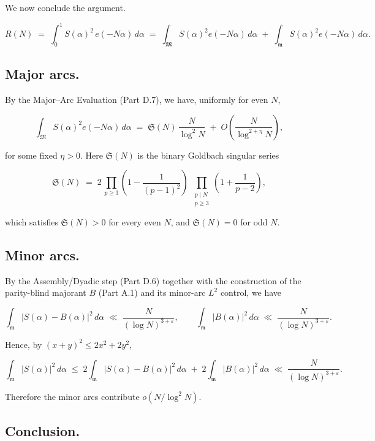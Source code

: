 \documentclass[11pt]{article}
\theoremstyle{definition}
\theoremstyle{remark}
\begin{document}
We now conclude the argument.

$$
R(N)\;=\;\int_0^1 S(\alpha)^2\,e(-N\alpha)\,d\alpha
\;=\;\int_{\mathfrak M} S(\alpha)^2 e(-N\alpha)\,d\alpha
\;+\;\int_{\mathfrak m} S(\alpha)^2 e(-N\alpha)\,d\alpha.
$$

\subsection*{Major arcs.}

By the Major–Arc Evaluation (Part D.7), we have, uniformly for even $N$,

$$
\int_{\mathfrak M} S(\alpha)^2 e(-N\alpha)\,d\alpha
\;=\;\mathfrak S(N)\,\frac{N}{\log^2 N}\;+\;O\!\left(\frac{N}{\log^{2+\eta}N}\right),
$$

for some fixed $\eta>0$. Here $\mathfrak S(N)$ is the binary Goldbach singular series

$$
\mathfrak S(N)
\;=\;2\,\prod_{p\ge 3}\!\left(1-\frac{1}{(p-1)^2}\right)
\;\prod_{\substack{p\mid N\\ p\ge 3}}\!\!\left(1+\frac{1}{p-2}\right),
$$

which satisfies $\mathfrak S(N)>0$ for every even $N$, and $\mathfrak S(N)=0$ for odd $N$.

\subsection*{Minor arcs.}

By the Assembly/Dyadic step (Part D.6) together with the construction of the parity-blind majorant $B$ (Part A.1) and its minor-arc $L^2$ control, we have

$$
\int_{\mathfrak m} |S(\alpha)-B(\alpha)|^2\,d\alpha
\;\ll\;\frac{N}{(\log N)^{3+\varepsilon}},
\qquad
\int_{\mathfrak m} |B(\alpha)|^2\,d\alpha
\;\ll\;\frac{N}{(\log N)^{3+\varepsilon}}.
$$

Hence, by $(x+y)^2\le 2x^2+2y^2$,

$$
\int_{\mathfrak m} |S(\alpha)|^2\,d\alpha
\;\le\;2\!\int_{\mathfrak m}\!|S(\alpha)-B(\alpha)|^2\,d\alpha
\;+\;2\!\int_{\mathfrak m}\!|B(\alpha)|^2\,d\alpha
\;\ll\;\frac{N}{(\log N)^{3+\varepsilon}}.
$$

Therefore the minor arcs contribute $o\!\left(N/\log^2 N\right)$.

\subsection*{Conclusion.}
\end{document}
